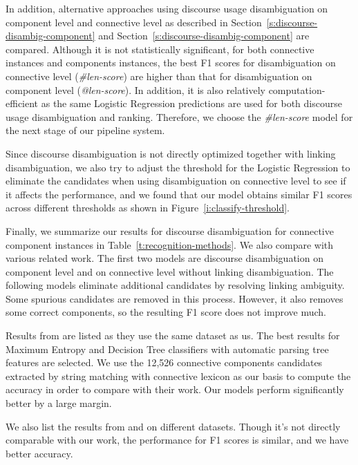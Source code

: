 In addition, alternative approaches using discourse usage
disambiguation on component level and connective
level as described in Section~\ref{s:discourse-disambig-component} and
Section~\ref{s:discourse-disambig-component} are compared.
Although it is not statistically significant, for both connective
instances and components instances, the best F1 scores for disambiguation on connective
level (\textit{\#len-score}) are higher than that for disambiguation on component level
(\textit{@len-score}).
In addition, it is also relatively computation-efficient as the same Logistic
Regression predictions are used for both discourse usage disambiguation and ranking.
Therefore, we choose the \textit{\#len-score} model for the next stage of our
pipeline system.



Since discourse disambiguation is not directly optimized together with linking
disambiguation, we also try to adjust the threshold for the Logistic Regression
to eliminate the candidates when using disambiguation on connective level to see if
it affects the performance, and we found that our model
obtains similar F1 scores across different thresholds as
shown in Figure~\ref{i:classify-threshold}.



Finally, we summarize our results for discourse disambiguation for
connective component instances in Table~\ref{t:recognition-methods}. We also
compare with various related work. The first two models are discourse disambiguation
on component level and on connective level without linking disambiguation. The following
models eliminate additional candidates by resolving linking ambiguity.
Some spurious candidates are removed in this process. However, it also removes some
correct components, so the resulting F1 score does not improve much.



Results from \cite{li2015automatic} are listed as they use the
same dataset as us. The best results for Maximum Entropy and Decision Tree classifiers with
automatic parsing tree features are selected. We use the 12,526 connective components candidates
extracted by string matching with connective lexicon as our basis to compute the accuracy in order
to compare with their work. Our models perform significantly better by a large margin.

We also list the results from \cite{zhou2012cross} and \cite{li2014cross} on different
datasets. Though it's not directly comparable with our work, the performance for F1 scores is similar,
and we have better accuracy.


